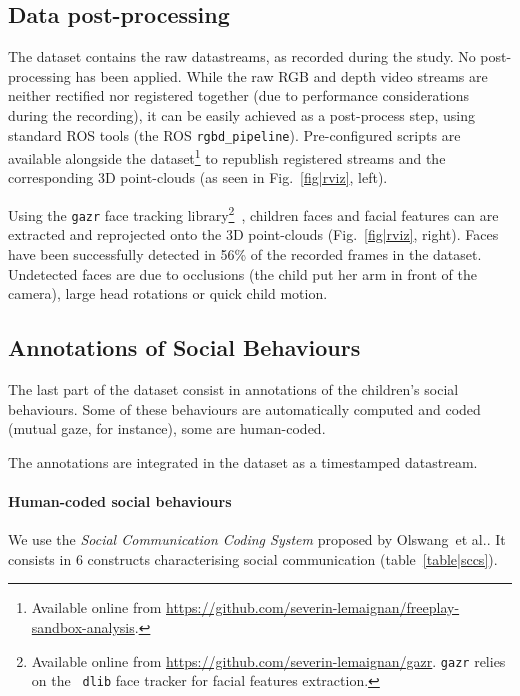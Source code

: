 \documentclass{article}
\newcommand{\etal}{et al.\xspace}
\begin{document}
\subsection{Data post-processing}
\label{postprocessing}

The dataset contains the raw datastreams, as recorded during the study. No post-processing has been applied.
While the raw RGB and depth video streams are neither rectified nor registered together (due
to performance considerations during the recording), it can be easily achieved
as a post-process step, using standard ROS tools (the ROS {\tt rgbd\_pipeline}).
Pre-configured scripts are available alongside the dataset\footnote{Available
online from
\url{https://github.com/severin-lemaignan/freeplay-sandbox-analysis}.} to
republish registered streams and the corresponding 3D point-clouds (as seen in
Fig.~\ref{fig|rviz}, left).

Using the {\tt gazr} face tracking library\footnote{Available online from
\url{https://github.com/severin-lemaignan/gazr}. {\tt gazr} relies on the {\tt
dlib} face tracker for facial features
extraction.}~\cite{lemaignan2016realtime}, children faces and facial features can
are extracted and reprojected onto the 3D point-clouds (Fig.~\ref{fig|rviz},
right). Faces have been successfully detected in 56\% of the recorded frames
in the dataset. Undetected faces are due to occlusions (the child put her arm in
front of the camera), large head rotations or quick child motion.

\subsection{Annotations of Social Behaviours}

The last part of the dataset consist in annotations of the
children's social behaviours. Some of these behaviours are automatically
computed and coded (mutual gaze, for instance), some are human-coded.

The annotations are integrated in the dataset as a timestamped datastream.

\paragraph{Human-coded social behaviours}

We use the \emph{Social Communication Coding System} proposed by
Olswang~\etal\cite{olswang2006reliability}. It consists in 6 constructs
characterising social communication (table~\ref{table|sccs}).
\end{document}
